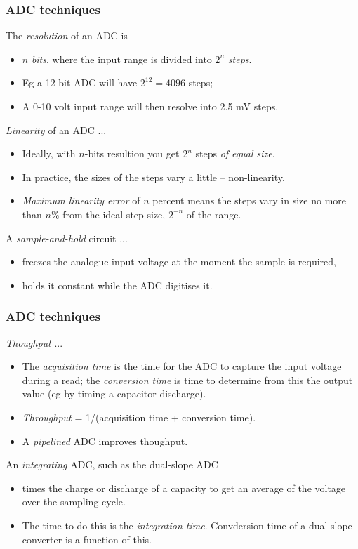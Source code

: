 \documentclass[10pt]{beamer}
\begin{document}
\begin{frame}
\frametitle{ADC techniques}
The \emph{resolution} of an ADC is
\begin{itemize}
\item $n$ \emph{bits}, where the input range is divided into $2^n$ \emph{steps}.
\item Eg a 12-bit ADC will have $2^12 = 4096$ steps;
\item A 0-10 volt input range will then resolve into 2.5 mV steps.
\end{itemize}

\emph{Linearity} of an ADC ...
\begin{itemize}
\item Ideally, with $n$-bits resultion you get $2^n$ steps \emph{of equal size}.
\item In practice, the sizes of the steps vary a little -- non-linearity.
\item \emph{Maximum linearity error} of $n$ percent means the steps vary in size no more than $n \%$ from the ideal step size, $2^{-n}$ of the range.
\end{itemize}

A \emph{sample-and-hold} circuit ...
\begin{itemize}
\item freezes the analogue input voltage at the moment the sample is required,
\item holds it constant while the ADC digitises it.
\end{itemize}
\end{frame}

\begin{frame}
\frametitle{ADC techniques}
\emph{Thoughput} ...
\begin{itemize}
\item The \emph{acquisition time} is the time for the ADC to capture the input voltage during a read; the \emph{conversion time} is time to determine from this the output value (eg by timing a capacitor discharge).
\item \emph{Throughput} = 1/(acquisition time + conversion time).
\item A \emph{pipelined} ADC improves thoughput.
\end{itemize}

An \emph{integrating} ADC, such as the dual-slope ADC
\begin{itemize}
\item times the charge or discharge of a capacity to get an average of the voltage over the sampling cycle.
\item The time to do this is the \emph{integration time}. Convdersion time of a dual-slope converter is a function of this.
\end{itemize}
\end{frame}
\end{document}
